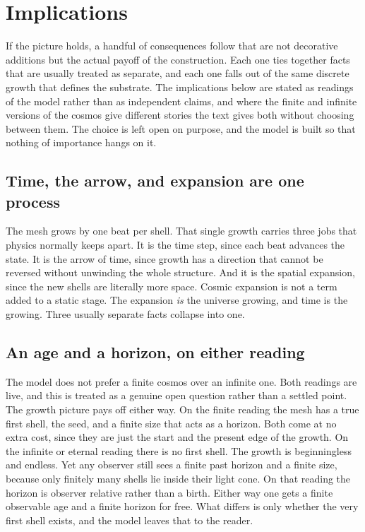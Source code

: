 \section{Implications}

If the picture holds, a handful of consequences follow that are not decorative additions but the actual payoff of the construction. Each one ties together facts that are usually treated as separate, and each one falls out of the same discrete growth that defines the substrate. The implications below are stated as readings of the model rather than as independent claims, and where the finite and infinite versions of the cosmos give different stories the text gives both without choosing between them. The choice is left open on purpose, and the model is built so that nothing of importance hangs on it.

\subsection{Time, the arrow, and expansion are one process}

The mesh grows by one beat per shell. That single growth carries three jobs that physics normally keeps apart. It is the time step, since each beat advances the state. It is the arrow of time, since growth has a direction that cannot be reversed without unwinding the whole structure. And it is the spatial expansion, since the new shells are literally more space. Cosmic expansion is not a term added to a static stage. The expansion \emph{is} the universe growing, and time is the growing. Three usually separate facts collapse into one.

\subsection{An age and a horizon, on either reading}

The model does not prefer a finite cosmos over an infinite one. Both readings are live, and this is treated as a genuine open question rather than a settled point. The growth picture pays off either way. On the finite reading the mesh has a true first shell, the seed, and a finite size that acts as a horizon. Both come at no extra cost, since they are just the start and the present edge of the growth. On the infinite or eternal reading there is no first shell. The growth is beginningless and endless. Yet any observer still sees a finite past horizon and a finite size, because only finitely many shells lie inside their light cone. On that reading the horizon is observer relative rather than a birth. Either way one gets a finite observable age and a finite horizon for free. What differs is only whether the very first shell exists, and the model leaves that to the reader.

